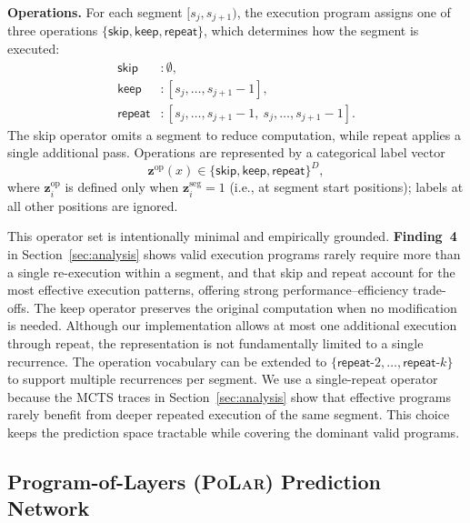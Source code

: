\documentclass{article}
\theoremstyle{plain}
\theoremstyle{definition}
\theoremstyle{remark}
\newcommand\ours{\textsc{PoLar}\xspace}
\begin{document}
\textbf{Operations.}
For each segment $[s_j,s_{j+1})$, the execution program assigns one of three operations
$\{\textsf{skip},\textsf{keep},\textsf{repeat}\}$, which determines how the segment is executed:
\begingroup
\setlength{\abovedisplayskip}{0pt}
\setlength{\belowdisplayskip}{0pt}
\[
\textstyle
\begin{aligned}
\textsf{skip}   &: \emptyset,\\
\textsf{keep}   &: [s_j,\ldots,s_{j+1}-1],\\
\textsf{repeat} &: [s_j,\ldots,s_{j+1}-1,\ s_j,\ldots,s_{j+1}-1].
\end{aligned}
\]
\endgroup
The \textsf{skip} operator omits a segment to reduce computation,
while \textsf{repeat} applies a single additional pass.
Operations are represented by a categorical label vector
\begingroup
\setlength{\abovedisplayskip}{2pt}
\setlength{\belowdisplayskip}{2pt}
\[
\textstyle
\mathbf{z}^{\text{op}}(x)\in\{\textsf{skip},\textsf{keep},\textsf{repeat}\}^D,
\]
\endgroup
where $\mathbf{z}^{\text{op}}_i$ is defined only when $\mathbf{z}^{\text{seg}}_i=1$
(i.e., at segment start positions); labels at all other positions are ignored.

This operator set is intentionally minimal and empirically grounded.
\textbf{Finding~4} in Section~\ref{sec:analysis} shows  valid execution programs
rarely require more than a single re-execution within a segment,
and that \textsf{skip} and \textsf{repeat} account for the most effective execution patterns,
offering strong performance--efficiency trade-offs.
The \textsf{keep} operator preserves the original computation when no modification is needed.
Although our implementation allows at most one additional execution through
\textsf{repeat}, the representation is not fundamentally limited to a single
recurrence. The operation vocabulary can be extended to
$\{\textsf{repeat}\text{-}2,\ldots,\textsf{repeat}\text{-}k\}$ to support
multiple recurrences per segment. We use a single-repeat operator because the
MCTS traces in Section~\ref{sec:analysis} show that effective programs rarely
benefit from deeper repeated execution of the same segment. This choice keeps
the prediction space tractable while covering the dominant valid programs.




\subsection{Program-of-Layers (\ours) Prediction Network}
\label{sec:policy}
\end{document}
